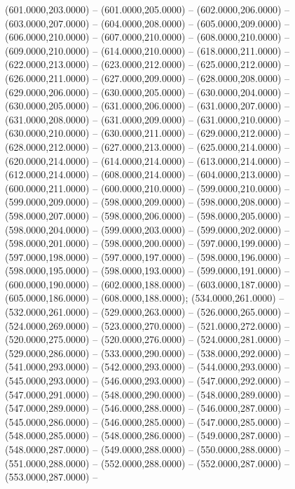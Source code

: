 \begin{scope}[shift={(-231.87,-121.87)}]
\begin{scope}[draw=black,fill=cfdae61,line join=round,line width=0.208pt]
        (601.0000,203.0000) -- (601.0000,205.0000) -- (602.0000,206.0000) --
        (603.0000,207.0000) -- (604.0000,208.0000) -- (605.0000,209.0000) --
        (606.0000,210.0000) -- (607.0000,210.0000) -- (608.0000,210.0000) --
        (609.0000,210.0000) -- (614.0000,210.0000) -- (618.0000,211.0000) --
        (622.0000,213.0000) -- (623.0000,212.0000) -- (625.0000,212.0000) --
        (626.0000,211.0000) -- (627.0000,209.0000) -- (628.0000,208.0000) --
        (629.0000,206.0000) -- (630.0000,205.0000) -- (630.0000,204.0000) --
        (630.0000,205.0000) -- (631.0000,206.0000) -- (631.0000,207.0000) --
        (631.0000,208.0000) -- (631.0000,209.0000) -- (631.0000,210.0000) --
        (630.0000,210.0000) -- (630.0000,211.0000) -- (629.0000,212.0000) --
        (628.0000,212.0000) -- (627.0000,213.0000) -- (625.0000,214.0000) --
        (620.0000,214.0000) -- (614.0000,214.0000) -- (613.0000,214.0000) --
        (612.0000,214.0000) -- (608.0000,214.0000) -- (604.0000,213.0000) --
        (600.0000,211.0000) -- (600.0000,210.0000) -- (599.0000,210.0000) --
        (599.0000,209.0000) -- (598.0000,209.0000) -- (598.0000,208.0000) --
        (598.0000,207.0000) -- (598.0000,206.0000) -- (598.0000,205.0000) --
        (598.0000,204.0000) -- (599.0000,203.0000) -- (599.0000,202.0000) --
        (598.0000,201.0000) -- (598.0000,200.0000) -- (597.0000,199.0000) --
        (597.0000,198.0000) -- (597.0000,197.0000) -- (598.0000,196.0000) --
        (598.0000,195.0000) -- (598.0000,193.0000) -- (599.0000,191.0000) --
        (600.0000,190.0000) -- (602.0000,188.0000) -- (603.0000,187.0000) --
        (605.0000,186.0000) -- (608.0000,188.0000);
       (534.0000,261.0000) -- (532.0000,261.0000) --
        (529.0000,263.0000) -- (526.0000,265.0000) -- (524.0000,269.0000) --
        (523.0000,270.0000) -- (521.0000,272.0000) -- (520.0000,275.0000) --
        (520.0000,276.0000) -- (524.0000,281.0000) -- (529.0000,286.0000) --
        (533.0000,290.0000) -- (538.0000,292.0000) -- (541.0000,293.0000) --
        (542.0000,293.0000) -- (544.0000,293.0000) -- (545.0000,293.0000) --
        (546.0000,293.0000) -- (547.0000,292.0000) -- (547.0000,291.0000) --
        (548.0000,290.0000) -- (548.0000,289.0000) -- (547.0000,289.0000) --
        (546.0000,288.0000) -- (546.0000,287.0000) -- (545.0000,286.0000) --
        (546.0000,285.0000) -- (547.0000,285.0000) -- (548.0000,285.0000) --
        (548.0000,286.0000) -- (549.0000,287.0000) -- (548.0000,287.0000) --
        (549.0000,288.0000) -- (550.0000,288.0000) -- (551.0000,288.0000) --
        (552.0000,288.0000) -- (552.0000,287.0000) -- (553.0000,287.0000) --

\end{scope}
\end{scope}
